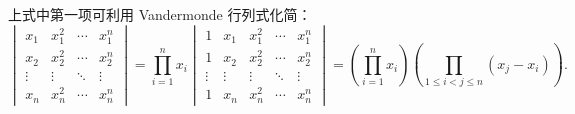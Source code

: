 \begin{exercise}
\begin{exgroup}
\begin{answer}
            上式中第一项可利用 Vandermonde 行列式化简：
            \[
                \begin{vmatrix}
                    x_1    & x_1^2  & \cdots & x_1^n  \\
                    x_2    & x_2^2  & \cdots & x_2^n  \\
                    \vdots & \vdots & \ddots & \vdots \\
                    x_n    & x_n^2  & \cdots & x_n^n
                \end{vmatrix} = \prod_{i=1}^n x_i \begin{vmatrix}
                    1      & x_1    & x_1^2  & \cdots & x_1^n  \\
                    1      & x_2    & x_2^2  & \cdots & x_2^n  \\
                    \vdots & \vdots & \vdots & \ddots & \vdots \\
                    1      & x_n    & x_n^2  & \cdots & x_n^n
                \end{vmatrix} = \left(\prod_{i=1}^n x_i\right) \left(\prod_{1 \leqslant i < j \leqslant n} (x_j - x_i)\right).
            \]


\end{answer}
\end{exgroup}
\end{exercise}
